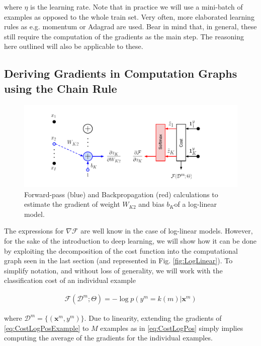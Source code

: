 \noindent where $\eta$ is the learning rate. Note that in practice we will use
a mini-batch of examples as opposed to the whole train set. Very often, more
elaborated learning rules as e.g. momentum or Adagrad are used. Bear in mind
that, in general, these still require the computation of the gradients as the
main step. The reasoning here outlined will also be applicable to these.  

\subsection{Deriving Gradients in Computation Graphs using the Chain Rule}

\begin{figure}[!h]
\centering
\includegraphics[scale=0.6]{figs/deep_learning/loglin_color.pdf}
\caption{Forward-pass (blue) and Backpropagation (red) calculations to estimate the gradient of weight $W_{K2}$ and bias $b_K$of a log-linear model.}
\label{fig:LogLinColor}
\end{figure}

The expressions for $\nabla\mathcal{F}$ are well know in the case of log-linear models. However, for
the sake of the introduction to deep learning, we will show how it can
be done by exploiting the decomposition of the cost function into the computational
graph seen in the last section (and represented in Fig. \ref{fig:LogLinear}). To simplify notation, and without loss of generality, we will work with the 
classification cost of an individual example 

\begin{align}
\mathcal{F}(\mathcal{D}^m;\Theta) 
= -\log p(y^m=k(m) | \mathbf{x}^m) 
\label{eq:CostLogPosExample}
\end{align}

where $\mathcal{D}^m=\{(\mathbf{x}^m, y^m)\}$. Due to linearity, extending the
gradients of \ref{eq:CostLogPosExample} to $M$ examples as in
\ref{eq:CostLogPos} simply implies computing the average of the gradients for
the individual examples.

